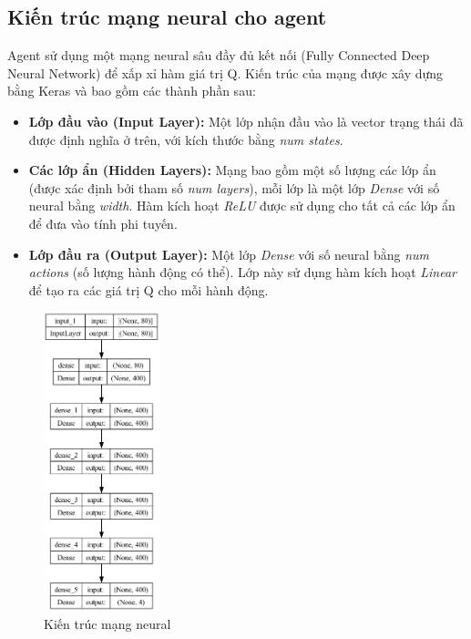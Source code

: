 \subsection{Kiến trúc mạng neural cho agent}

Agent sử dụng một mạng neural sâu đầy đủ kết nối (Fully Connected Deep Neural Network) để xấp xỉ hàm giá trị Q. Kiến trúc của mạng được xây dựng bằng Keras và bao gồm các
thành phần sau:

\begin{itemize}
    \item \textbf{Lớp đầu vào (Input Layer):} Một lớp nhận đầu vào là vector
        trạng thái đã được định nghĩa ở trên, với kích thước bằng \textit{num
        states}.

    \item \textbf{Các lớp ẩn (Hidden Layers):} Mạng bao gồm một số lượng các lớp
        ẩn (được xác định bởi tham số \textit{num layers}), mỗi lớp là một lớp
        \textit{Dense} với số neural bằng \textit{width}. Hàm kích hoạt \textit{ReLU}
        được sử dụng cho tất cả các lớp ẩn để đưa vào tính phi tuyến.

    \item \textbf{Lớp đầu ra (Output Layer):} Một lớp \textit{Dense} với số neural
        bằng \textit{num actions} (số lượng hành động có thể). Lớp này sử dụng hàm
        kích hoạt \textit{Linear} để tạo ra các giá trị Q cho mỗi hành động.
\end{itemize}

\begin{figure}[!htp]
    \centering
    \includegraphics[width=0.3\textwidth]{img/model_structure}
    \caption{Kiến trúc mạng neural}
    \label{fig:model_structure}
\end{figure}

